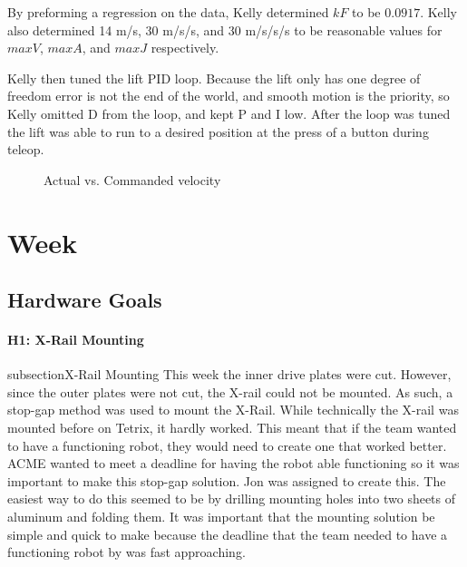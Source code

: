 \documentclass{article}
\begin{document}
By preforming a regression on the data, Kelly determined $kF$ to be $0.0917$. Kelly also determined 14 m/s, 30 m/s/s, and 30 m/s/s/s to be reasonable values for $maxV$, $maxA$, and $maxJ$ respectively.

Kelly then tuned the lift PID loop. Because the lift only has one degree of freedom error is not the end of the world, and smooth motion is the priority, so Kelly omitted D from the loop, and kept P and I low. After the loop was tuned the lift was able to run to a desired position at the press of a button during teleop.

\begin {figure}
\centering
{}
\caption {Actual vs. Commanded velocity}
\label {fig:graph}
\end{figure}
\clearpage \newpage \section{Week \thesection} 
\subsection{Hardware Goals}
\paragraph{H1: X-Rail Mounting}
subsection{X-Rail Mounting}
This week the inner drive plates were cut. However, since the outer plates were not cut, the X-rail could not be mounted. As such, a stop-gap method was used to mount the X-Rail. While technically the X-rail was mounted before on Tetrix, it hardly worked. This meant that if the team wanted to have a functioning robot, they would need to create one that worked better. ACME wanted to meet a deadline for having the robot able functioning so it was important to make this stop-gap solution. Jon was assigned to create this. The easiest way to do this seemed to be by drilling mounting holes into two sheets of aluminum and folding them. It was important that the mounting solution be simple and quick to make because the deadline that the team needed to have a functioning robot by was fast approaching. 
\end{document}
